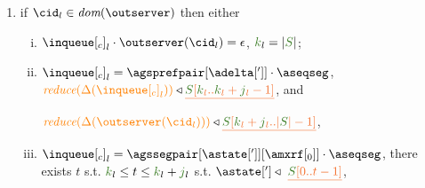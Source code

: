 \begin{definition}
\begin{enumerate}
%
%	


	
\item \label{prop_inclient} if $\cid_l \in \dom{\outserver}$ then either

    \begin{enumerate}[i.]
     \item ${\inclient}_l \cdot \outserver(\cid_l)  = \epsilon$, $\tknown_l = |\queuemessage|$; %

     \item ${\inclient}_l = \agsprefpair[{\adelta[']}]\cdot\aseqseg$,
      $\ireduce{\igetdeltas{{\inclient}_l}}\triangleleft \flatten{ \queuemessage[\tknown_l..\tknown_l+\treceivebuffer_l-1]}$,  and
      
      
      $\ireduce{\igetdeltas{\outserver(\cid_l)}}\triangleleft 
       \flatten{\queuemessage[\tknown_l+\treceivebuffer_l..|\queuemessage| - 1]}$,
  
%      
%	      
%	      
%
%     
%      
%           
     \item ${\inclient}_l = \agssegpair[{\astate[']}][{\amxrf[_0]}]\cdot\aseqseg$,      
  		 there exists $t$ s.t. $\tknown_l\leq t \leq \tknown_l+\treceivebuffer_l$ s.t. $\astate['] \triangleleft \ \flatten{\queuemessage[0 .. t - 1]}$, 



\end{enumerate}
\end{enumerate}
\end{definition}
